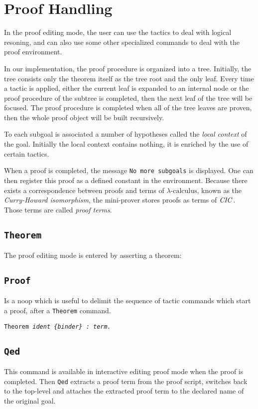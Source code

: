 \section{Proof Handling}

In the proof editing mode, the user can use the tactics to deal with logical resoning,
and can also use some other specialized commands to deal with the proof environment.

In our implementation, the proof procedure is organized into a tree. Initially, the tree
consists only the theorem itself as the tree root and the only leaf.
Every time a tactic is applied, either
the current leaf is expanded to an internal node or the proof procedure of the subtree is completed, then the next leaf of the tree will be focused. The proof procedure is completed
when all of the tree leaves are proven, then the whole proof object will be built recursively.

To each subgoal is associated a number of hypotheses called the {\it local context} of the goal.
Initially the local context contains nothing, it is enriched by the use of certain tactics.

When a proof is completed, the message {\tt No more subgoals} is displayed. One can then register this
proof as a defined constant in the environment. Because there exists a correspondence between proofs and terms of
$\lambda\text{-calculus}$, known as the {\it Curry-Howard isomorphism}, the mini-prover stores proofs as terms of $\it CIC$.
Those terms are called {\it proof terms}.

\subsection{\tt Theorem}
The proof editing mode is entered by asserting a theorem:

\subsection{\tt Proof}
Is a noop which is useful to delimit the sequence of tactic commands which start a proof, after a
{\tt Theorem} command.

{\tt Theorem \sl ident \{binder\} : term.}
\subsection{\tt Qed}
This command is available in interactive editing proof mode when the proof is completed.
Then {\tt Qed} extracts a proof term from the proof script, switches back to the top-level and
attaches the extracted proof term to the declared name of the original goal.

